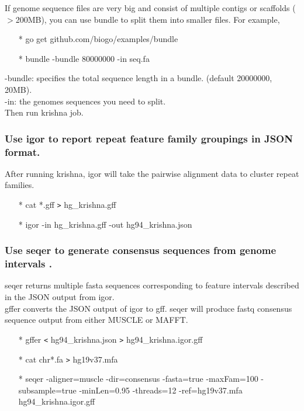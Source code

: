 \documentclass[12pt]{article}
\begin{document}
\noindent If genome sequence files are very big and consist of multiple contigs or scaffolds ($>$200MB), you can use bundle to split them into smaller files. For example,

\begin{enumerate}
	\item[*] go get github.com/biogo/examples/bundle
	\item[*] bundle -bundle 80000000 -in seq.fa
\end{enumerate}

\noindent -bundle: specifies the total sequence length in a bundle. (default 20000000, 20MB).\\
-in: the genomes sequences you need to split.\\
Then run krishna job.\\

\subsubsection{Use igor to report repeat feature family groupings in JSON format.}

After running krishna, igor will take the pairwise alignment data to cluster repeat families.
\begin{enumerate}
	\item[*] cat *.gff \texttt{>} hg\_krishna.gff
	\item[*] igor -in hg\_krishna.gff -out hg94\_krishna.json
\end{enumerate}

\subsubsection{Use seqer to generate consensus sequences from genome intervals .}
seqer returns multiple fasta sequences corresponding to feature intervals described in the JSON output from igor. \\

gffer converts the JSON output of igor to gff. seqer will produce fastq consensus sequence output from either MUSCLE or MAFFT. 

\begin{enumerate}
	\item[*] gffer \texttt{<} hg94\_krishna.json \texttt{>} hg94\_krishna.igor.gff
	\item[*] cat chr*.fa \texttt{>} hg19v37.mfa
	\item[*] seqer -aligner=muscle -dir=consensus -fasta=true -maxFam=100 -subsample=true -minLen=0.95 -threads=12 -ref=hg19v37.mfa hg94\_krishna.igor.gff
\end{enumerate}
\end{document}

